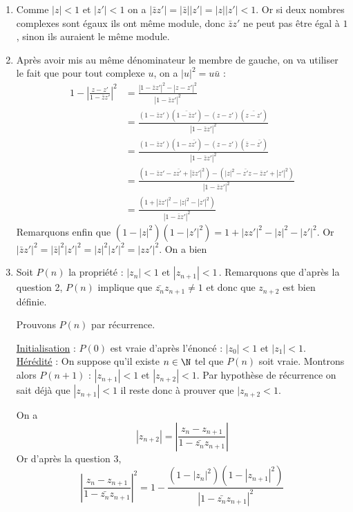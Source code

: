 \begin{correction}
\begin{enumerate}
\item Comme $|z|<1$ et $|z'|<1$ on a $|\bar{z}z'|= |\bar{z}| |z'| =|z||z'| <1$. Or si deux nombres complexes sont égaux ils ont même module, donc $\bar{z}z' $ ne peut pas être égal à $1$, sinon ils auraient le même module. 
\item Après avoir mis au même dénominateur le membre de gauche, on va utiliser le fait que pour tout complexe $u$, on a $|u|^2 = u\bar{u}$ :
\begin{align*}
1- \left| \frac{z-z'}{1-\bar{z} z' } \right|^2  &= \frac{| 1-\bar{z} z' |^2 -|z-z' |^2}{|1-\bar{z} z'  |^2}\\
&= \frac{( 1-\bar{z} z' )(\bar{ 1-\bar{z} z'} )   -(z-z' )(\bar{z-z'})}{|1-\bar{z} z'  |^2}\\
&= \frac{( 1-\bar{z} z' )(1-z\bar{z'}  )   -(z-z' )(\bar{z}-\bar{z'})}{|1-\bar{z} z'  |^2}\\
&= \frac{( 1-\bar{z} z' -z\bar{z'} + |\bar{z}z'|^2  )   -(|z|^2-\bar{z'}z - \bar{z}z' +|z'|^2)}{|1-\bar{z} z'  |^2}\\
&= \frac{( 1+ |\bar{z}z'|^2-|z|^2-|z'|^2)}{|1-\bar{z} z'  |^2}
\end{align*}
Remarquons enfin que $(1-|z|^2) (1-|z'|^2)  =1 +|zz'|^2 -|z|^2 -|z'|^2$. Or 
$ |\bar{z}z'|^2 = |\bar{z}|^2|z'|^2 =|z|^2 |z'|^2  = |zz'|^2$.
On a bien 


\item Soit $P(n)$ la propriété : \og $|z_n|<1$ et $|z_{n+1}|<1$\fg \,. Remarquons que d'après la question 2, $P(n)$ implique que $\bar{z_n}z_{n+1}\neq 1 $ et donc que $z_{n+2}$ est bien définie. 

Prouvons $P(n)$ par récurrence. 

\underline{Initialisation} : 
$P(0)$ est vraie d'après l'énoncé : $|z_0|<1 $ et $|z_1|<1$.\\

\underline{Hérédité} : On suppose qu'il existe $n\in \N$   tel que $P(n)$ soit vraie. Montrons alors $P(n+1)$ :  \og $|z_{n+1}|<1$ et $|z_{n+2}|<1$\fg. Par hypothèse de récurrence on sait déjà que $|z_{n+1}|<1$ il reste donc à prouver que $|z_{n+2} <1$. 

On a $$|z_{n+2}| = \left|\frac{z_n-z_{n+1}}{1-\bar{z_{n}} z_{n+1}}\right|$$
 Or d'après la question 3, 
 $$ \left|\frac{z_n-z_{n+1}}{1-\bar{z_{n}} z_{n+1}}\right|^2 = 1- \frac{(1-|z_n|^2) (1-|z_{n+1}|^2) }{|1-\bar{z_n} z_{n+1}  |^2}$$
 

\end{enumerate}
\end{correction}
